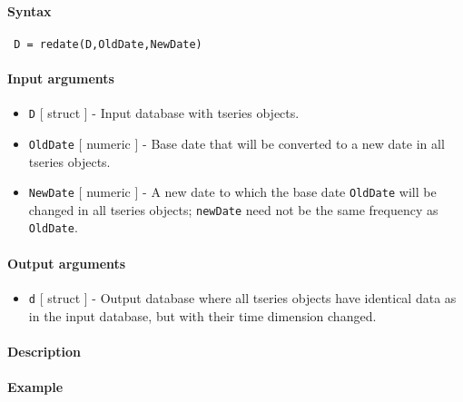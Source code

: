 


	\paragraph{Syntax}
 
 \begin{verbatim}
 D = redate(D,OldDate,NewDate)
 \end{verbatim}
 
 \paragraph{Input arguments}
 
 \begin{itemize}
 \item
   \texttt{D} {[} struct {]} - Input database with tseries objects.
 \item
   \texttt{OldDate} {[} numeric {]} - Base date that will be converted to
   a new date in all tseries objects.
 \item
   \texttt{NewDate} {[} numeric {]} - A new date to which the base date
   \texttt{OldDate} will be changed in all tseries objects;
   \texttt{newDate} need not be the same frequency as \texttt{OldDate}.
 \end{itemize}
 
 \paragraph{Output arguments}
 
 \begin{itemize}
 \item
   \texttt{d} {[} struct {]} - Output database where all tseries objects
   have identical data as in the input database, but with their time
   dimension changed.
 \end{itemize}
 
 \paragraph{Description}
 
 \paragraph{Example}


